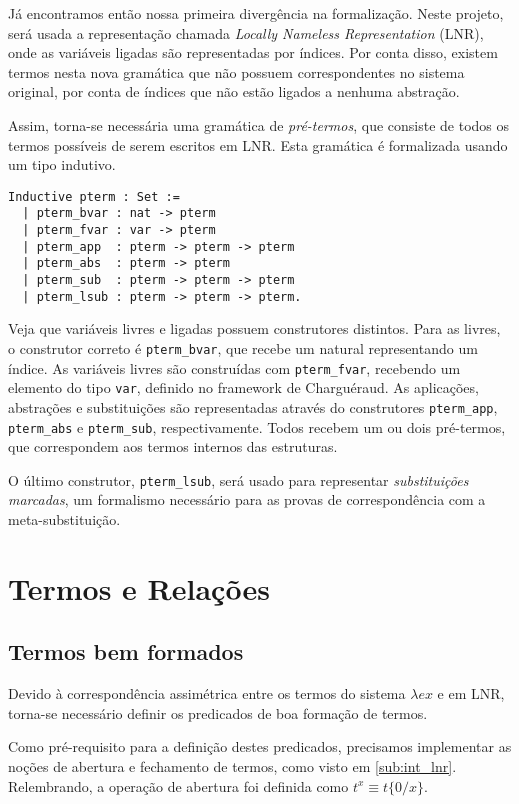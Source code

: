 Já encontramos então nossa primeira divergência na formalização. Neste projeto,
será usada a representação chamada \textit{Locally Nameless Representation}
(LNR), onde as variáveis ligadas são representadas por índices. Por conta disso,
existem termos nesta nova gramática que não possuem correspondentes no sistema
original, por conta de índices que não estão ligados a nenhuma abstração.

Assim, torna-se necessária uma gramática de \emph{pré-termos}, que consiste de
todos os termos possíveis de serem escritos em LNR. Esta gramática é formalizada
usando um tipo indutivo.

\begin{lstlisting}[basicstyle=\small]
Inductive pterm : Set :=
  | pterm_bvar : nat -> pterm
  | pterm_fvar : var -> pterm
  | pterm_app  : pterm -> pterm -> pterm
  | pterm_abs  : pterm -> pterm
  | pterm_sub  : pterm -> pterm -> pterm 
  | pterm_lsub : pterm -> pterm -> pterm.
\end{lstlisting}

Veja que variáveis livres e ligadas possuem construtores distintos. Para as
livres, o construtor correto é \texttt{pterm\_bvar}, que recebe um natural
representando um índice. As variáveis livres são construídas com
\texttt{pterm\_fvar}, recebendo um elemento do tipo \texttt{var}, definido no
framework de Charguéraud.
As aplicações, abstrações e substituições são representadas através do
construtores \texttt{pterm\_app}, \texttt{pterm\_abs} e \texttt{pterm\_sub},
respectivamente. Todos recebem um ou dois pré-termos, que correspondem aos
termos internos das estruturas.

O último construtor, \texttt{pterm\_lsub}, será usado para representar
\emph{substituições marcadas}, um formalismo necessário para as provas de
correspondência com a meta-substituição.

\section{Termos e Relações}
\subsection{Termos bem formados}

Devido à correspondência assimétrica entre os termos do sistema $\lambda ex$ e
em LNR, torna-se necessário definir os predicados de boa formação de termos.

Como pré-requisito para a definição destes predicados, precisamos implementar as
noções de abertura e fechamento de termos, como visto em \ref{sub:int_lnr}. 
Relembrando, a operação de abertura foi definida como $t^{x} \equiv t\{0/x\}$.

